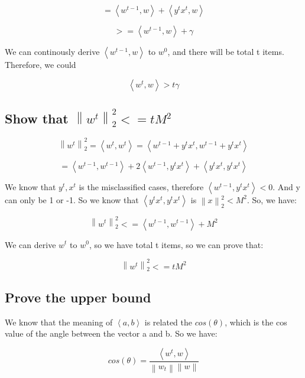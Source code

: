 \documentclass{article} %
\newcommand{\norm}[1]{\left\lVert #1 \right\rVert}
\newcommand{\inner}[1]{\left\langle #1 \right\rangle}
\begin{document}
\begin{equation}
= \inner{w^{t-1},w} + \inner{y^t x^t, w}
\end{equation}

\begin{equation}
>= \inner{w^{t-1},w} + \gamma
\end{equation}

We can continously derive $\inner{w^{t-1}, w}$ to $w^0$, and there will be total
t items. Therefore, we could

\begin{equation}
\inner{w^t, w} > t \gamma
\end{equation}


\subsection{Show that $\norm{w^t}_2^2 <= tM^2$}
\begin{equation}
\norm{w^t}_2^2 = \inner{w^t,w^t}
= \inner{w^{t-1}+y^tx^t, w^{t-1}+y^tx^t}
\end{equation}

\begin{equation}
= \inner{w^{t-1},w^{t-1}} + 2 \inner{w^{t-1},y^tx^t} + \inner{y^tx^t,y^tx^t}
\end{equation}

We know that $y^t, x^t$ is the misclassified cases, therefore
$\inner{w^{t-1},y^tx^t} < 0$. And y can only be 1 or -1. So we know that
$\inner{y^tx^t, y^tx^t}$ is $\norm{x}^2_2 < M^2$. So, we have:

\begin{equation}
\norm{w^t}_2^2 <= \inner{w^{t-1},w^{t-1}} + M^2
\end{equation}

We can derive $w^t$ to $w^0$, so we have total t items, so we can prove that:

\begin{equation}
\norm{w^t}_2^2 <= tM^2
\end{equation}


\subsection{Prove the upper bound}
We know that the meaning of $\inner{a,b}$ is related the $cos(\theta)$, which is the cos
value of the angle between the vector a and b. So we have:

\begin{equation}
cos(\theta) = \frac{\inner{w^t,w}}{\norm{w_t} \norm{w}}
\end{equation}
\end{document}
